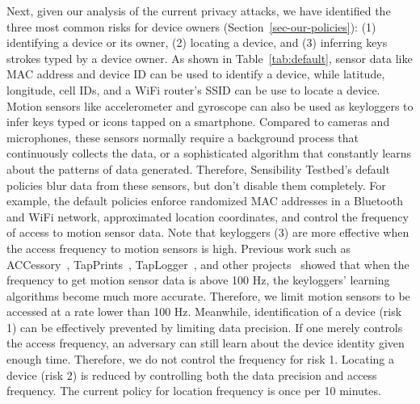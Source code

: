 Next, given our analysis of the current privacy attacks, we have identified the three 
most common 
risks for device owners (Section~\ref{sec-our-policies}): (1) identifying a device or its owner, 
(2) locating a device, and (3) inferring keys strokes typed by a device owner. 
As shown in Table~\ref{tab:default}, 
sensor data like MAC address and device ID can be used to identify a device, while latitude, longitude, cell 
IDs, and a WiFi router's SSID can be use to locate a 
device. Motion sensors like accelerometer and gyroscope can also be used
as keyloggers to infer keys typed or icons tapped on a 
smartphone. Compared to cameras and microphones, these 
sensors normally require a background process that continuously 
collects the data, or a sophisticated algorithm that constantly learns 
about the patterns of data generated. 
Therefore, Sensibility Testbed's default policies 
blur data from these sensors, but don't disable them completely. 
For example, the default policies enforce randomized MAC addresses in a 
Bluetooth and WiFi network, approximated location coordinates, and 
control the frequency of access to motion sensor data. Note that keyloggers (3)
are more effective when the access frequency to motion sensors is 
high. Previous work such as ACCessory~\cite{owusu2012accessory}, 
TapPrints~\cite{miluzzo2012tapprints}, TapLogger~\cite{xu2012taplogger}, 
and other projects~\cite{aviv2012practicality} showed that when the 
frequency to get motion sensor data is above 100 Hz, the keyloggers' 
learning algorithms become much more accurate. Therefore, we limit 
motion sensors to be accessed at a rate lower than 100 Hz. Meanwhile, 
identification of a device (risk 1) can be effectively prevented by limiting data 
precision. If one merely controls the access frequency, an adversary can 
still learn about the device identity given enough time. Therefore, we do
not control the frequency for risk 1. Locating a device (risk 2) is reduced by 
controlling both the data precision and access frequency. The current policy
for location frequency is once per 10 minutes.  

